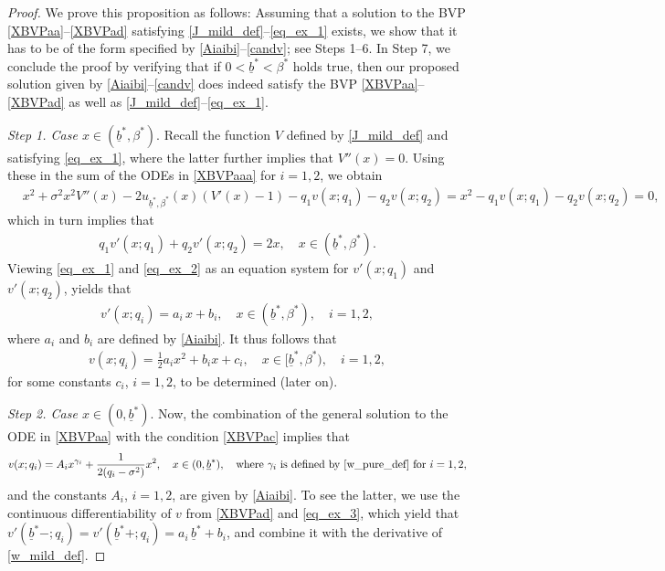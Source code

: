 \documentclass[10pt,a4paper]{amsart}
\def\ub{\underline{b}}
\begin{document}
\begin{proof} 
We prove this proposition as follows:
Assuming that a solution to the BVP \eqref{XBVPaa}--\eqref{XBVPad} satisfying \eqref{J_mild_def}--\eqref{eq_ex_1} exists, we show that it has to be of the form specified by \eqref{Aiaibi}--\eqref{candv}; see Steps 1--6. 
In Step 7, we conclude the proof by verifying that if  $0 < \ub^* < \beta^*$ holds true, then our proposed solution given by \eqref{Aiaibi}--\eqref{candv} does indeed satisfy the BVP \eqref{XBVPaa}--\eqref{XBVPad} as well as \eqref{J_mild_def}--\eqref{eq_ex_1}. 



\vspace{1mm}
{\it Step 1. Case $x \in (\ub^*,\beta^*)$}.
Recall the function $V$ defined by \eqref{J_mild_def} and satisfying \eqref{eq_ex_1}, where the latter further implies that $V''(x)=0$. 
Using these in the sum of the ODEs in \eqref{XBVPaaa} for $i=1,2$, we obtain
\begin{align} \label{eq_ex_2b}
&x^2 + \sigma^2 x^2 V''(x) - 2 u_{\ub^*,\beta^*}(x) (V'(x) - 1) - q_1 v(x;q_1) - q_2 v(x;q_2) %
= x^2 - q_1 v(x;q_1) - q_2 v(x;q_2) = 0, 
\end{align}
which in turn implies that 
\begin{align} \label{eq_ex_2}
q_1 v'(x;q_1) + q_2 v'(x;q_2) = 2x , \quad x \in (\ub^*, \beta^*). 
\end{align}
Viewing \eqref{eq_ex_1} and \eqref{eq_ex_2} as an equation system for $v'(x;q_1)$ and $v'(x;q_2)$, yields that 
\begin{align} \label{eq_ex_3}
v'(x;q_i) = a_i \, x + b_i, \quad x \in (\ub^*, \beta^*), \quad i=1,2, 
\end{align}
where $a_i$ and $b_i$ are defined by \eqref{Aiaibi}. 
It thus follows that 
\begin{align}\label{hq2hkl12r}
v(x;q_i) = \tfrac{1}{2} a_i x^2 + b_i x + c_i, 
\quad x \in [\ub^*,\beta^*), \quad i=1,2, 
\end{align}
for some constants $c_i$, $i=1,2$, to be determined (later on). 

\vspace{1mm}
{\it Step 2. Case $x \in (0,\ub^*)$}.
Now, the combination of the general solution to the ODE in \eqref{XBVPaa} with the condition \eqref{XBVPac} implies that 
\begin{align}\label{w_mild_def}
v(x;q_i)=A_i x^{\gamma_i}+\frac{1}{2(q_i-\sigma^2)} x^2, \quad x\in (0,\ub^*), 
\quad \text{where } \gamma_i \text{ is defined by \eqref{w_pure_def} for $i=1,2$},
\end{align}
and the constants $A_i$, $i=1,2$, are given by \eqref{Aiaibi}. 
To see the latter, we use the continuous differentiability of $v$ from \eqref{XBVPad} and \eqref{eq_ex_3}, which yield that $v'(\ub^*-;q_i) = v'(\ub^*+;q_i) = a_i \, \ub^* + b_i$, and combine it with the derivative of \eqref{w_mild_def}. 


\end{proof}
\end{document}
